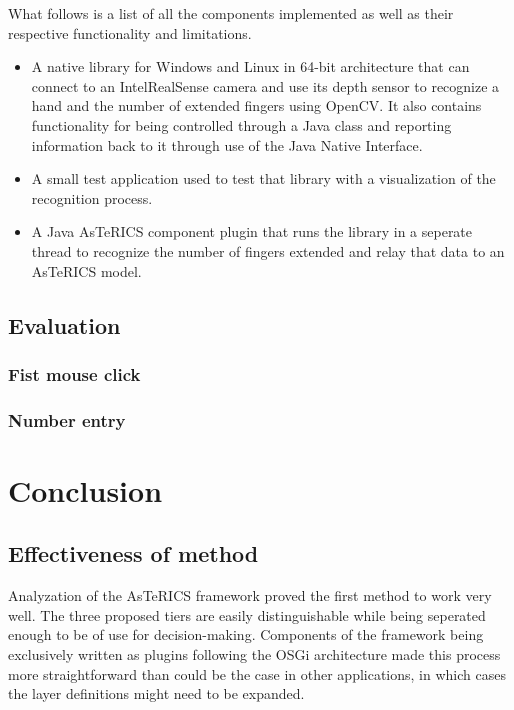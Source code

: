 \documentclass[BSA,Bachelor,english]{twbook}%
\begin{document}
What follows is a list of all the components implemented as well as their respective functionality and limitations.

\begin{itemize}
	\item A native library for Windows and Linux in 64-bit architecture that can connect to an IntelRealSense camera and use its depth sensor to recognize a hand and the number of extended fingers using OpenCV. It also contains functionality for being controlled through a Java class and reporting information back to it through use of the Java Native Interface.
	\item A small test application used to test that library with a visualization of the recognition process.
	\item A Java AsTeRICS component plugin that runs the library in a seperate thread to recognize the number of fingers extended and relay that data to an AsTeRICS model.
\end{itemize}

\newpage

\section{Evaluation}
\subsection{Fist mouse click}
\subsection{Number entry}


\chapter{Conclusion}
\section{Effectiveness of method}

Analyzation of the AsTeRICS framework proved the first method to work very well. The three proposed tiers are easily distinguishable while being seperated enough to be of use for decision-making. Components of the framework being exclusively written as plugins following the OSGi architecture made this process more straightforward than could be the case in other applications, in which cases the layer definitions might need to be expanded.
\end{document}
